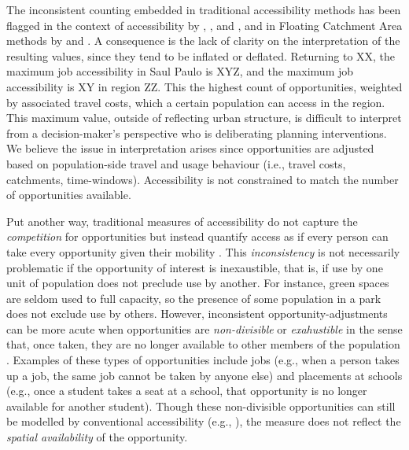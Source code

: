 \documentclass[]{elsarticle} %
\begin{document}
The inconsistent counting embedded in traditional accessibility methods
has been flagged in the context of accessibility by
\citet{merlin2017competition}, \citet{allen2019}, and
\citet{kelobonye2020measuring}, and in Floating Catchment Area methods
by \citet{delamater2013spatial} and \citet{paez2019}. A consequence is
the lack of clarity on the interpretation of the resulting values, since
they tend to be inflated or deflated. Returning to XX, the maximum job
accessibility in Saul Paulo is XYZ, and the maximum job accessibility is
XY in region ZZ. This the highest count of opportunities, weighted by
associated travel costs, which a certain population can access in the
region. This maximum value, outside of reflecting urban structure, is
difficult to interpret from a decision-maker's perspective who is
deliberating planning interventions. We believe the issue in
interpretation arises since opportunities are adjusted based on
population-side travel and usage behaviour (i.e., travel costs,
catchments, time-windows). Accessibility is not constrained to match the
number of opportunities available.

Put another way, traditional measures of accessibility do not capture
the \emph{competition} for opportunities but instead quantify access as
if every person can take every opportunity given their mobility
\citep{paez2019, kelobonye2020measuring}. This \emph{inconsistency} is
not necessarily problematic if the opportunity of interest is
inexaustible, that is, if use by one unit of population does not
preclude use by another. For instance, green spaces are seldom used to
full capacity, so the presence of some population in a park does not
exclude use by others. However, inconsistent opportunity-adjustments can
be more acute when opportunities are \emph{non-divisible} or
\emph{exahustible} in the sense that, once taken, they are no longer
available to other members of the population \citep[also discussed
by][]{geurs2004}. Examples of these types of opportunities include jobs
(e.g., when a person takes up a job, the same job cannot be taken by
anyone else) and placements at schools (e.g., once a student takes a
seat at a school, that opportunity is no longer available for another
student). Though these non-divisible opportunities can still be modelled
by conventional accessibility (e.g., ), the measure does not reflect the
\emph{spatial availability} of the opportunity.
\end{document}
